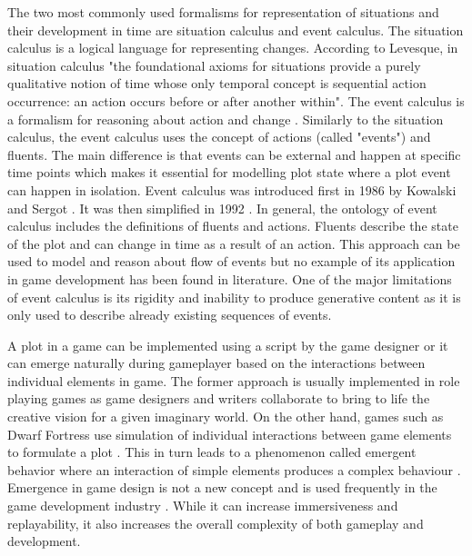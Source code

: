 The two most commonly used formalisms for representation of situations and their development in time are situation calculus and event calculus.
The situation calculus is a logical language for representing changes\cite{lin2008situation}.
According to Levesque, in situation calculus "the foundational axioms for situations provide a purely qualitative notion of time whose only temporal concept is sequential action occurrence: an action occurs before or after another within"\cite{levesque1998foundations}.
The event calculus is a formalism for reasoning about action and change \cite{mueller2008event}.
Similarly to the situation calculus, the event calculus uses the concept of actions (called "events") and fluents.
The main difference is that events can be external and happen at specific time points which makes it essential for modelling plot state where a plot event can happen in isolation.
Event calculus was introduced first in 1986 by Kowalski and Sergot \cite{kowalski1986logic}.
It was then simplified in 1992 \cite{kakas1992abductive}.
In general, the ontology of event calculus includes the definitions of fluents and actions.
Fluents describe the state of the plot and can change in time as a result of an action.
This approach can be used to model and reason about flow of events but no example of its application in game development has been found in literature.
One of the major limitations of event calculus is its rigidity and inability to produce generative content as it is only used to describe already existing sequences of events.

A plot in a game can be implemented using a script by the game designer or it can emerge naturally during gameplayer based on the interactions between individual elements in game.
The former approach is usually implemented in role playing games as game designers and writers collaborate to bring to life the creative vision for a given imaginary world.
On the other hand, games such as Dwarf Fortress use simulation of individual interactions between game elements to formulate a plot \cite{adams2015simulation}.
This in turn leads to a phenomenon called emergent behavior where an interaction of simple elements produces a complex behaviour \cite{adams2019emergent}.
Emergence in game design is not a new concept and is used frequently in the game development industry \cite{sweetser2008emergence}.
While it can increase immersiveness and replayability, it also increases the overall complexity of both gameplay and development.

